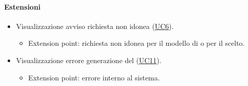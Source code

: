 \paragraph*{Estensioni}
\begin{itemize}
  \item Visualizzazione avviso richiesta non idonea (\hyperref[UC6]{UC6}).
  \begin{itemize}
    \item Extension point: richiesta non idonea per il modello di  o per il  scelto.
  \end{itemize}
  \item Visualizzazione errore generazione del  (\hyperref[UC11]{UC11}).
    \begin{itemize}
      \item Extension point: errore interno al sistema.
    \end{itemize}
\end{itemize}